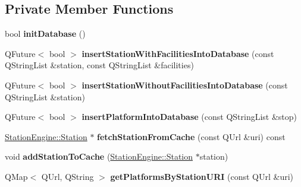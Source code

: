 \subsection*{Private Member Functions}
\begin{DoxyCompactItemize}
\item 
\mbox{\label{classStationEngine_1_1Factory_ae97fddbe0a8ef42024bd1b9a295b5a1a}} 
bool {\bfseries init\+Database} ()
\item 
\mbox{\label{classStationEngine_1_1Factory_ab8c16d5f36fa5ab4d55f4648e5b9de85}} 
Q\+Future$<$ bool $>$ {\bfseries insert\+Station\+With\+Facilities\+Into\+Database} (const Q\+String\+List \&station, const Q\+String\+List \&facilities)
\item 
\mbox{\label{classStationEngine_1_1Factory_a390ba2b14c1473025470b077202d095f}} 
Q\+Future$<$ bool $>$ {\bfseries insert\+Station\+Without\+Facilities\+Into\+Database} (const Q\+String\+List \&station)
\item 
\mbox{\label{classStationEngine_1_1Factory_abbd0d01d21431b969955e3515848a615}} 
Q\+Future$<$ bool $>$ {\bfseries insert\+Platform\+Into\+Database} (const Q\+String\+List \&stop)
\item 
\mbox{\label{classStationEngine_1_1Factory_a3f9a807b6019f8c85b11445f4de8d8ba}} 
\mbox{\hyperlink{classStationEngine_1_1Station}{Station\+Engine\+::\+Station}} $\ast$ {\bfseries fetch\+Station\+From\+Cache} (const Q\+Url \&uri) const
\item 
\mbox{\label{classStationEngine_1_1Factory_a4b9c7838d8e88b0ee429d26b3936e464}} 
void {\bfseries add\+Station\+To\+Cache} (\mbox{\hyperlink{classStationEngine_1_1Station}{Station\+Engine\+::\+Station}} $\ast$station)
\item 
\mbox{\label{classStationEngine_1_1Factory_a35a0cfd90547e76c5d5612073fd7a331}} 
Q\+Map$<$ Q\+Url, Q\+String $>$ {\bfseries get\+Platforms\+By\+Station\+U\+RI} (const Q\+Url \&uri)
\item 
\mbox{\label{classStationEngine_1_1Factory_ab871018160a944731e87db4c772e377e}} 

\end{DoxyCompactItemize}

